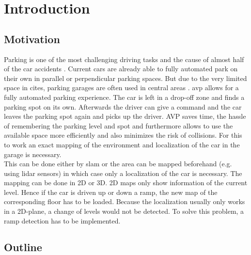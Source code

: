 \chapter{Introduction}
\label{ch:Introduction}

\section{Motivation}
Parking is one of the most challenging driving tasks and the cause of almost half of the car accidents \cite{accident}.
Current cars are already able to fully automated park on their own in parallel or perpendicular parking spaces.
But due to the very limited space in cites, parking garages are often used in central areas \cite{7995971}.
\gls{avp} allows for a fully automated parking experience.
The car is left in a drop-off zone and finds a parking spot on its own.
 Afterwards the driver can give a command and the car leaves the parking spot again and picks up the driver.
 AVP saves time, the hassle of remembering the parking level and spot and furthermore allows to use the available space more efficiently and also minimizes the risk of collisions.
 For this to work an exact mapping of the environment and localization of the car in the garage is necessary.\\
This can be done either by \gls{slam} or the area can be mapped beforehand (e.g. using \gls{lidar} sensors) in which case only a localization of the car is necessary.
The mapping can be done in 2D or 3D. 2D maps only show information of the current level. Hence if the car is driven up or down a ramp, the new map of the corresponding floor has to be loaded.
Because the localization usually only works in a 2D-plane, a change of levels would not be detected.
To solve this problem, a ramp detection has to be implemented.



\section{Outline}
